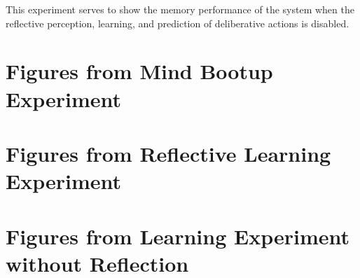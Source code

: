  {This experiment serves to show the memory
  performance of the system when the reflective perception, learning,
  and prediction of deliberative actions is disabled.}


\clearpage
\section{Figures from Mind Bootup Experiment}


\clearpage
\section{Figures from Reflective Learning Experiment}


\clearpage
\section{Figures from Learning Experiment without Reflection}


